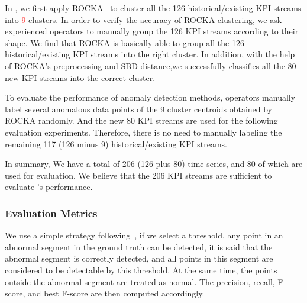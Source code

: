 In \name{}, we first apply ROCKA~\cite{lirobust} to cluster all the 126 historical/existing KPI streams into \textcolor{red}{9} clusters. In order to verify the accuracy of ROCKA clustering, we ask experienced operators to manually group the 126 KPI streams according to their shape. We find that ROCKA is basically able to group all the 126 historical/existing KPI streams into the right cluster. In addition, with the help of ROCKA's preprocessing and SBD distance,we successfully classifies all the 80 new KPI streams into the correct cluster.

To evaluate the performance of anomaly detection methods, operators manually label several anomalous data points of the 9 cluster centroids obtained by ROCKA randomly. And the new 80 KPI streams are used for the following evaluation experiments. Therefore, there is no need to manually labeling the remaining 117 (126 minus 9) historical/existing KPI streams. 

In summary, We have a total of 206 (126 plus 80) time series, and 80 of which are used for evaluation. We believe that the 206 KPI streams are sufficient to evaluate \name{}'s performance.

\subsubsection{Evaluation Metrics}
\label{subsec:evaluation_metrics}
We use a simple strategy following~\cite{xu2018unsupervised}, if we select a threshold, any point in an abnormal segment in the ground truth can be detected, it is said that the abnormal segment is correctly detected, and all points in this segment are considered to be detectable by this threshold. At the same time, the points outside the abnormal segment are treated as normal. The precision, recall, F-score, and best F-score are then computed accordingly.


